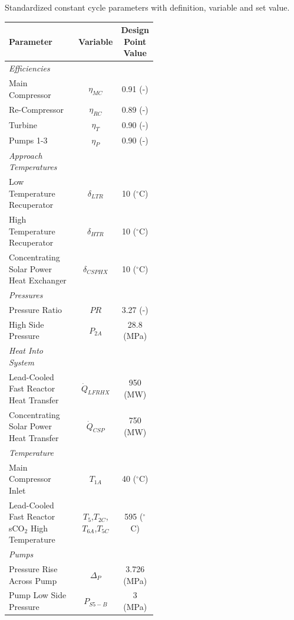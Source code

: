\begin{paracol}{2}
\begin{specialtable}[H] 
    \caption{Standardized constant cycle parameters with definition, variable and set value. \label{tab-cycle-constants}}
    \begin{tabular}{L{0.5\linewidth}cc}
    \toprule
    \textbf{Parameter} & \textbf{Variable}	& \textbf{Design Point Value}\\
    \midrule
    \textit{Efficiencies}\\
    Main Compressor & $\eta_{MC}$		& 0.91 (-)\\
    Re-Compressor & $\eta_{RC}$		& 0.89 (-)\\
    Turbine & $\eta_{T}$		& 0.90 (-)\\
    Pumps 1-3 & $\eta_{P}$      & 0.90 (-)\\
    \midrule
    \textit{Approach Temperatures}\\
    Low Temperature Recuperator & $\delta_{LTR}$		& 10 ($^{\circ}$C)\\
    High Temperature Recuperator & $\delta_{HTR}$		& 10 ($^{\circ}$C)\\
    Concentrating Solar Power Heat Exchanger & $\delta_{CSPHX}$	& 10 ($^{\circ}$C)\\
    \midrule
    \textit{Pressures}\\
    Pressure Ratio & $PR$ & 3.27 (-)\\
    High Side Pressure & $P_{2A}$ & 28.8 (MPa)\\
    \midrule
    \textit{Heat Into System}\\
    Lead-Cooled Fast Reactor Heat Transfer & $\dot{Q}_{LFRHX}$ & 950 (MW)\\
    Concentrating Solar Power Heat Transfer & $\dot{Q}_{CSP}$ & 750 (MW)\\
    \midrule
    \textit{Temperature}\\
    Main Compressor Inlet & $T_{1A}$ & 40 ($^{\circ}$C)\\
    Lead-Cooled Fast Reactor sCO$_{2}$ High Temperature & $T_{5}$,$T_{2C}$,$T_{6A}$,$T_{5C}$ & 595 ($^{\circ}$C)\\
    \midrule
    \textit{Pumps}\\
    Pressure Rise Across Pump & $\Delta_{P}$ & 3.726 (MPa)\\
    Pump Low Side Pressure & $P_{S5-B}$ & 3 (MPa)\\ 
    \bottomrule
    \end{tabular}
\end{specialtable}


\end{paracol}
